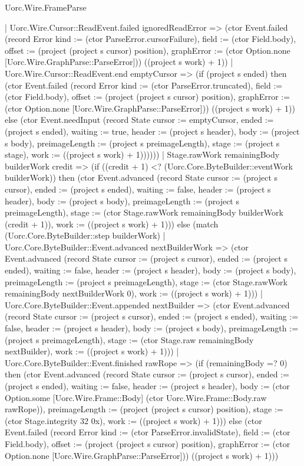\begin{lexlean}{Uorc.Wire.FrameParse}
\begin{semanticmodule}
{      | Uorc.Wire.Cursor::ReadEvent.failed ignoredReadError => (ctor Event.failed (record Error {kind := (ctor ParseError.cursorFailure), field := (ctor Field.body), offset := (project (project s cursor) position), graphError := (ctor Option.none [Uorc.Wire.GraphParse::ParseError])}) ((project s work) + 1))
      | Uorc.Wire.Cursor::ReadEvent.end emptyCursor => (if (project s ended) then (ctor Event.failed (record Error {kind := (ctor ParseError.truncated), field := (ctor Field.body), offset := (project (project s cursor) position), graphError := (ctor Option.none [Uorc.Wire.GraphParse::ParseError])}) ((project s work) + 1)) else (ctor Event.needInput (record State {cursor := emptyCursor, ended := (project s ended), waiting := true, header := (project s header), body := (project s body), preimageLength := (project s preimageLength), stage := (project s stage), work := ((project s work) + 1)})))))
    | Stage.rawWork remainingBody builderWork credit => (if ((credit + 1) <? (Uorc.Core.ByteBuilder::eventWork builderWork)) then (ctor Event.advanced (record State {cursor := (project s cursor), ended := (project s ended), waiting := false, header := (project s header), body := (project s body), preimageLength := (project s preimageLength), stage := (ctor Stage.rawWork remainingBody builderWork (credit + 1)), work := ((project s work) + 1)})) else (match (Uorc.Core.ByteBuilder::step builderWork)
      | Uorc.Core.ByteBuilder::Event.advanced nextBuilderWork => (ctor Event.advanced (record State {cursor := (project s cursor), ended := (project s ended), waiting := false, header := (project s header), body := (project s body), preimageLength := (project s preimageLength), stage := (ctor Stage.rawWork remainingBody nextBuilderWork 0), work := ((project s work) + 1)}))
      | Uorc.Core.ByteBuilder::Event.appended nextBuilder => (ctor Event.advanced (record State {cursor := (project s cursor), ended := (project s ended), waiting := false, header := (project s header), body := (project s body), preimageLength := (project s preimageLength), stage := (ctor Stage.raw remainingBody nextBuilder), work := ((project s work) + 1)}))
      | Uorc.Core.ByteBuilder::Event.finished rawRope => (if (remainingBody =? 0) then (ctor Event.advanced (record State {cursor := (project s cursor), ended := (project s ended), waiting := false, header := (project s header), body := (ctor Option.some [Uorc.Wire.Frame::Body] (ctor Uorc.Wire.Frame::Body.raw rawRope)), preimageLength := (project (project s cursor) position), stage := (ctor Stage.integrity 32 0x), work := ((project s work) + 1)})) else (ctor Event.failed (record Error {kind := (ctor ParseError.invalidState), field := (ctor Field.body), offset := (project (project s cursor) position), graphError := (ctor Option.none [Uorc.Wire.GraphParse::ParseError])}) ((project s work) + 1)))
}
\end{semanticmodule}
\end{lexlean}
